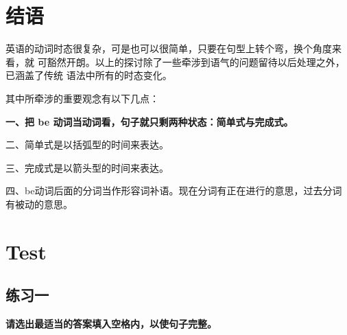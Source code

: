 \documentclass{yufa}
\begin{document}
\section{结语}

英语的动词时态很复杂，可是也可以很简单，只要在句型上转个弯，换个角度来看，就
可豁然开朗。以上的探讨除了一些牵涉到语气的问题留待以后处理之外，已涵盖了传统
语法中所有的时态变化。

其中所牵涉的重要观念有以下几点：

{\bfseries 一、把 be 动词当动词看，句子就只剩两种状态：简单式与完成式。

  二、简单式是以括弧型的时间来表达。

  三、完成式是以箭头型的时间来表达。

  四、be动词后面的分词当作形容词补语。现在分词有正在进行的意思，过去分词有被动的意思。}


\section{Test}

\subsection{练习一}

\textbf{请选出最适当的答案填入空格内，以使句子完整。}
\end{document}
